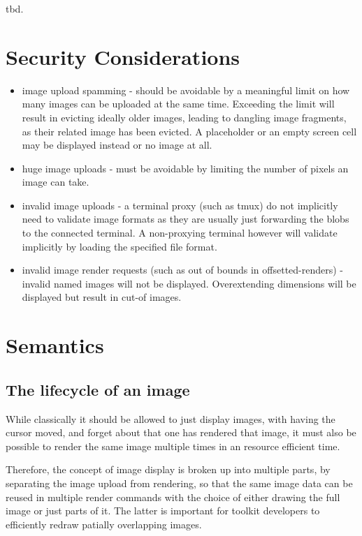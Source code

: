 \documentclass[a4paper]{article}
\begin{document}

tbd.

\section{Security Considerations} %

\begin{itemize}
    \item image upload spamming - should be avoidable by a meaningful limit
        on how many images can be uploaded at the same time.
        Exceeding the limit will result in evicting ideally older images,
        leading to dangling image fragments, as their related image has been
        evicted. A placeholder or an empty screen cell may be displayed instead or no image at all.
    \item huge image uploads - must be avoidable by limiting the number
        of pixels an image can take.
    \item invalid image uploads - a terminal proxy (such as tmux) do not
        implicitly need to validate image formats as they are usually just
        forwarding the blobs to the connected terminal. A non-proxying
        terminal however will validate implicitly by loading the specified
        file format.
    \item invalid image render requests (such as out of bounds in offsetted-renders) -
        invalid named images will not be displayed.
        Overextending dimensions will be displayed but result in cut-of images.
\end{itemize}

\section{Semantics} %
\subsection{The lifecycle of an image} %

While classically it should be allowed to just display images,
with having the cursor moved, and forget about that one has rendered that
image, it must also be possible to render the same image multiple times
in an resource efficient time.

Therefore, the concept of image display is broken up into multiple parts,
by separating the image upload from rendering, so
that the same image data can be reused in multiple render commands with
the choice of either drawing the full image or just parts of it.
The latter is important for toolkit developers to efficiently redraw
patially overlapping images.
\end{document}
